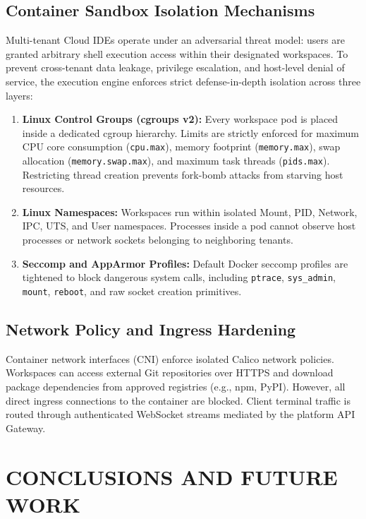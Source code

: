 \documentclass[12pt,a4paper]{report}
\begin{document}
	\section{Container Sandbox Isolation Mechanisms}
	Multi-tenant Cloud IDEs operate under an adversarial threat model: users are granted arbitrary shell execution access within their designated workspaces. To prevent cross-tenant data leakage, privilege escalation, and host-level denial of service, the execution engine enforces strict defense-in-depth isolation across three layers:
	\begin{enumerate}
		\item \textbf{Linux Control Groups (cgroups v2):} Every workspace pod is placed inside a dedicated cgroup hierarchy. Limits are strictly enforced for maximum CPU core consumption (\texttt{cpu.max}), memory footprint (\texttt{memory.max}), swap allocation (\texttt{memory.swap.max}), and maximum task threads (\texttt{pids.max}). Restricting thread creation prevents fork-bomb attacks from starving host resources.
		\item \textbf{Linux Namespaces:} Workspaces run within isolated Mount, PID, Network, IPC, UTS, and User namespaces. Processes inside a pod cannot observe host processes or network sockets belonging to neighboring tenants.
		\item \textbf{Seccomp and AppArmor Profiles:} Default Docker seccomp profiles are tightened to block dangerous system calls, including \texttt{ptrace}, \texttt{sys\_admin}, \texttt{mount}, \texttt{reboot}, and raw socket creation primitives.
	\end{enumerate}
	
	\section{Network Policy and Ingress Hardening}
	Container network interfaces (CNI) enforce isolated Calico network policies. Workspaces can access external Git repositories over HTTPS and download package dependencies from approved registries (e.g., npm, PyPI). However, all direct ingress connections to the container are blocked. Client terminal traffic is routed through authenticated WebSocket streams mediated by the platform API Gateway.
	
	\chapter{CONCLUSIONS AND FUTURE WORK}
	
\end{document}
